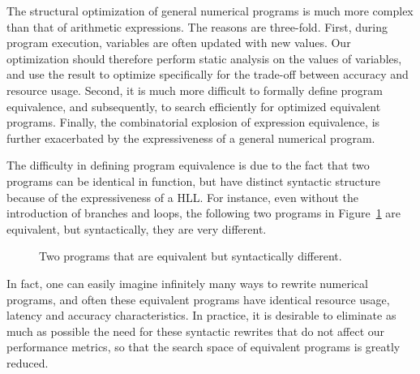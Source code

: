 The structural optimization of general numerical programs is much more complex
than that of arithmetic expressions.  The reasons are three-fold.  First,
during program execution, variables are often updated with new values.  Our
optimization should therefore perform static analysis on the values of
variables, and use the result to optimize specifically for the trade-off
between accuracy and resource usage.  Second, it is much more difficult to
formally define program equivalence, and subsequently, to search efficiently
for optimized equivalent programs.  Finally, the combinatorial explosion of
expression equivalence, is further exacerbated by the expressiveness of a
general numerical program.

The difficulty in defining program equivalence is due to the fact that
two programs can be identical in function, but have distinct syntactic
structure because of the expressiveness of a HLL\@.  For instance, even
without the introduction of branches and loops, the following two programs in
Figure~\ref{bg:fig:equiv_progs} are equivalent, but syntactically, they are
very different.
\begin{figure}[ht]
    \centering
     \qquad \qquad
    \caption{%
        Two programs that are equivalent but syntactically different.
    }\label{bg:fig:equiv_progs}
\end{figure}

In fact, one can easily imagine infinitely many ways to rewrite numerical
programs, and often these equivalent programs have identical resource usage,
latency and accuracy characteristics.  In practice, it is desirable to
eliminate as much as possible the need for these syntactic rewrites that do not
affect our performance metrics, so that the search space of equivalent programs
is greatly reduced.

